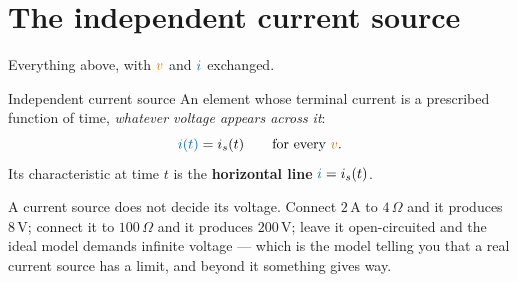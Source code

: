 \documentclass[11pt,a4paper]{article}
\newcommand{\Icol}[1]{\textcolor{ccur}{#1}}
\newcommand{\Vcol}[1]{\textcolor{cvolt}{#1}}
\newcommand{\uni}[1]{\,\mathrm{#1}}
\newcommand{\A}{\uni{A}}   \newcommand{\V}{\uni{V}}
\newcommand{\ohm}{\,\Omega}
\newcommand{\viaxes}[3]{%
  \draw[vax] (-#1,0) -- (#1,0) node[right=1pt, font=\scriptsize, text=cvolt] {$v$};
  \draw[vax] (0,-#2) -- (0,#2) node[above=1pt, font=\scriptsize, text=ccur] {$i$};
  \node[ttl] at (0,-#2-0.68) {#3};}
\begin{document}
\section{The independent current source}

Everything above, with $\Vcol{v}$ and $\Icol{i}$ exchanged.

\begin{definitionbox}{Independent current source}
An element whose terminal current is a prescribed function of time, \emph{whatever voltage
appears across it}:
\[
  \Icol{i(t)} = i_s(t) \qquad\text{for every } \Vcol{v} .
\]
Its characteristic at time $t$ is the \textbf{horizontal line} $\Icol{i} = i_s(t)$.
\end{definitionbox}

\begin{center}
\end{center}
\vspace{2pt}

\begin{cautionbox}
A current source does not decide its voltage. Connect $2\A$ to $4\ohm$ and it produces
$8\V$; connect it to $100\ohm$ and it produces $200\V$; leave it open-circuited and the
ideal model demands infinite voltage --- which is the model telling you that a real current
source has a limit, and beyond it something gives way.
\end{cautionbox}
\end{document}
